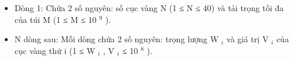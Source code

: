 \begin{itemize}
	\item     Dòng 1: Chứa 2 số nguyên: số cục vàng N (1 ≤ N ≤ 40) và tải trọng tối đa của túi M (1 ≤ M ≤ 10    $^     9    $    ).   
	\item     N dòng sau: Mỗi dòng chứa 2 số nguyên: trọng lượng W    $_     i    $    và giá trị V    $_     i    $    của cục vàng thứ i (1 ≤ W    $_     i    $    , V    $_     i    $    ≤ 10    $^     8    $    ).   
\end{itemize}